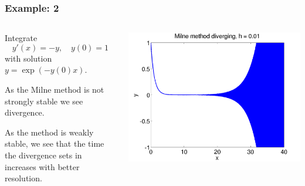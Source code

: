 \documentclass{beamer}
\begin{document}
\begin{frame}
  \frametitle{Example: 2}

  \begin{columns}
    \begin{column}{0.5\textwidth}
      Integrate
      \begin{equation*}
        y'(x) = -y, \quad y(0) = 1
      \end{equation*}
      with solution $y = \exp(- y(0) x)$. \pause

      \vspace{1ex}

      As the Milne method is not strongly stable we see
      divergence. \pause

      \vspace{1ex}

      As the method is weakly stable, we see that the time the
      divergence sets in increases with better resolution.
    \end{column}
    \begin{column}{0.5\textwidth}
      \begin{overlayarea}{\textwidth}{0.6\textheight}
        {
          \begin{center}
            \includegraphics[height=0.5\textheight]{figures/MilneStability1}
          \end{center}
        }
        {
          \begin{center}

\end{center}}
\end{overlayarea}
\end{column}
\end{columns}
\end{frame}
\end{document}
